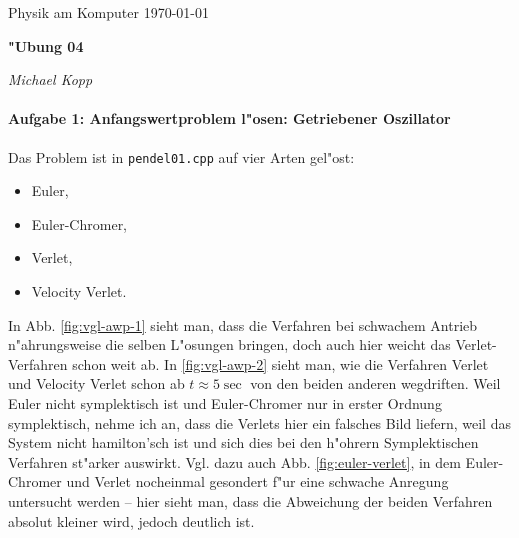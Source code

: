 \documentclass[a4paper,12pt]{article}
\begin{document}
\newcommand{\NAME}{Michael Kopp}
\newcommand{\FACH}{Physik am Komputer}
\newcommand{\TITEL}{"Ubung 04}
\newcommand{\DATUM}{\today}


\pagestyle{plain} 




\sloppy

\begin{center}
\FACH
\hfill
\DATUM
\end{center}

\vspace{-5mm} %

\begin{center}
  \begin{Large}
 \textbf{\TITEL}
  \end{Large}
\end{center}

\vspace{-3mm}

\begin{center}
\hrulefill
\quad 
\textit{\NAME}
\,
\hrulefill
\end{center}
 
 

\noindent

\paragraph{Aufgabe 1: Anfangswertproblem l"osen: Getriebener Oszillator}
\label{sec:aufg_1:_anfangsw_losen:_getr}

Das Problem ist in \texttt{pendel01.cpp} auf vier Arten gel"ost:
\begin{itemize}
\item Euler,
\item Euler-Chromer,
\item Verlet,
\item Velocity Verlet.
\end{itemize}
In Abb. \ref{fig:vgl-awp-1} sieht man, dass die Verfahren bei
schwachem Antrieb n"ahrungsweise die selben L"osungen bringen, doch
auch hier weicht das Verlet-Verfahren schon weit ab. In
\ref{fig:vgl-awp-2} sieht man, wie die Verfahren Verlet und Velocity
Verlet schon ab $t \approx 5 \operatorname{sec}$ von den beiden
anderen wegdriften. Weil Euler nicht symplektisch ist und
Euler-Chromer nur in erster Ordnung symplektisch, nehme ich an, dass
die Verlets hier ein falsches Bild liefern, weil das System nicht
hamilton'sch ist und sich dies bei den h"ohrern Symplektischen
Verfahren st"arker auswirkt. Vgl. dazu auch
Abb. \ref{fig:euler-verlet}, in dem Euler-Chromer und Verlet
nocheinmal gesondert f"ur eine schwache Anregung untersucht werden --
hier sieht man, dass die Abweichung der beiden Verfahren absolut
kleiner wird, jedoch deutlich ist.
\end{document}
